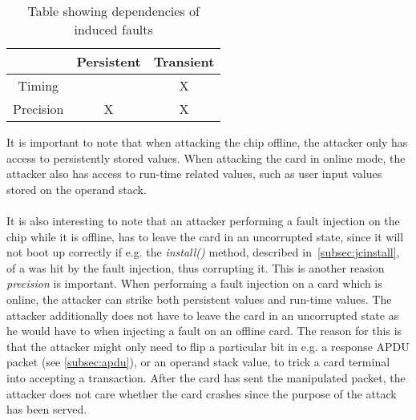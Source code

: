 \begin{table}[h!]
\centering
\begin{tabular}{|c|c|c|}
\hline  & Persistent & Transient \\ 
\hline Timing &  & X \\ 
\hline Precision & X & X \\ 
\hline 
\end{tabular} 
\caption{Table showing dependencies of induced faults}
\label{tab:dependencies}
\end{table}


It is important to note that when attacking the chip offline, the attacker only has access to persistently stored values. When attacking the card in online mode, the attacker also has access to run-time related values, such as user input values stored on the operand stack.\\\\
It is also interesting to note that an attacker performing a fault injection on the chip while it is offline, has to leave the card in an uncorrupted state, since it will not boot up correctly if e.g. the \textit{install()} method, described in~\cref{subsec:jcinstall}, of a \jc was hit by the fault injection, thus corrupting it. This is another reasion \textit{precision} is important. When performing a fault injection on a card which is online, the attacker can strike both persistent values and run-time values. The attacker additionally does not have to leave the card in an uncorrupted state as he would have to when injecting a fault on an offline card. The reason for this is that the attacker might only need to flip a particular bit in e.g. a response APDU packet (see \cref{subsec:apdu}), or an operand stack value, to trick a card terminal into accepting a transaction. After the card has sent the manipulated packet, the attacker does not care whether the card crashes since the purpose of the attack has been served.